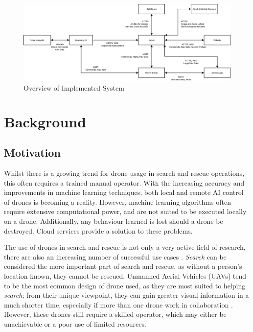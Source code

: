 \documentclass{article}
\begin{document}
\begin{landscape}
\begin{figure}[p]
\centering
\caption{Overview of Implemented System\label{fig:System}}
\includegraphics[width=1.5\textwidth, height=0.8\textheight]{System}
\end{figure}
\end{landscape}

\section{Background}
\subsection{Motivation}
Whilst there is a growing trend for drone usage in search and rescue operations, this often requires a trained manual operator. With the increasing accuracy and improvements in machine learning techniques, both local and remote AI control of drones is becoming a reality. However, machine learning algorithms often require extensive computational power, and are not suited to be executed locally on a drone. Additionally, any behaviour learned is lost should a drone be destroyed. Cloud services provide a solution to these problems.

The use of drones in search and rescue is not only a very active field of research, there are also an increasing number of successful use cases \cite{UAVUseCase}. \emph{Search} can be considered the more important part of search and rescue, as without a person's location known, they cannot be rescued. Unmanned Aerial Vehicles (UAVs) tend to be the most common design of drone used, as they are most suited to helping \emph{search}; from their unique viewpoint, they can gain greater visual information in a much shorter time, especially if more than one drone work in collaboration \cite{UAV}. However, these drones still require a skilled operator, which may either be unachievable or a poor use of limited resources.
\end{document}
